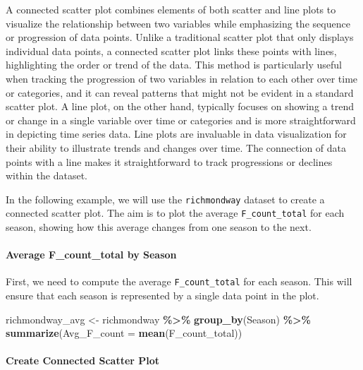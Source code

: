 \documentclass[
]{book}
\newenvironment{Shaded}{\begin{snugshade}}{\end{snugshade}}
\newcommand{\AttributeTok}[1]{\textcolor[rgb]{0.13,0.29,0.53}{#1}}
\newcommand{\FunctionTok}[1]{\textcolor[rgb]{0.13,0.29,0.53}{\textbf{#1}}}
\newcommand{\NormalTok}[1]{#1}
\newcommand{\OtherTok}[1]{\textcolor[rgb]{0.56,0.35,0.01}{#1}}
\newcommand{\SpecialCharTok}[1]{\textcolor[rgb]{0.81,0.36,0.00}{\textbf{#1}}}
\begin{document}
A connected scatter plot combines elements of both scatter and line plots to visualize the relationship between two variables while emphasizing the sequence or progression of data points. Unlike a traditional scatter plot that only displays individual data points, a connected scatter plot links these points with lines, highlighting the order or trend of the data. This method is particularly useful when tracking the progression of two variables in relation to each other over time or categories, and it can reveal patterns that might not be evident in a standard scatter plot. A line plot, on the other hand, typically focuses on showing a trend or change in a single variable over time or categories and is more straightforward in depicting time series data. Line plots are invaluable in data visualization for their ability to illustrate trends and changes over time. The connection of data points with a line makes it straightforward to track progressions or declines within the dataset.

In the following example, we will use the \texttt{richmondway} dataset to create a connected scatter plot. The aim is to plot the average \texttt{F\_count\_total} for each season, showing how this average changes from one season to the next.

\hypertarget{average-f_count_total-by-season}{%
\paragraph*{Average F\_count\_total by Season}\label{average-f_count_total-by-season}}

First, we need to compute the average \texttt{F\_count\_total} for each season. This will ensure that each season is represented by a single data point in the plot.

\begin{Shaded}
\begin{Highlighting}[]
\NormalTok{richmondway\_avg }\OtherTok{\textless{}{-}}\NormalTok{ richmondway }\SpecialCharTok{\%\textgreater{}\%}
  \FunctionTok{group\_by}\NormalTok{(Season) }\SpecialCharTok{\%\textgreater{}\%}
  \FunctionTok{summarize}\NormalTok{(}\AttributeTok{Avg\_F\_count =} \FunctionTok{mean}\NormalTok{(F\_count\_total))}
\end{Highlighting}
\end{Shaded}

\hypertarget{create-connected-scatter-plot}{%
\paragraph*{Create Connected Scatter Plot}\label{create-connected-scatter-plot}}
\end{document}
